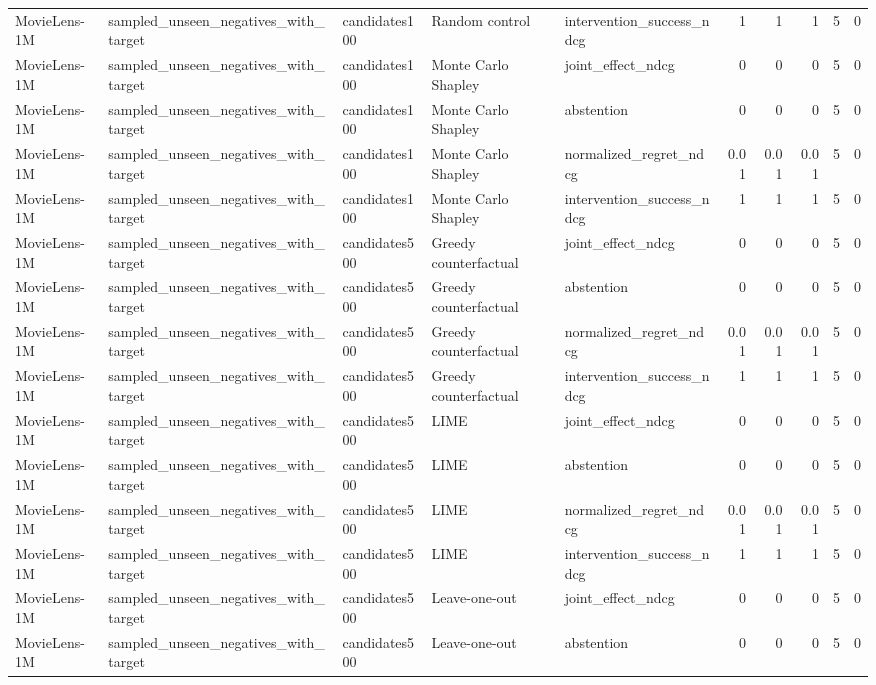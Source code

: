 \begin{table}[t]
{\begin{tabular}{lllllrrrrr}
MovieLens-1M & sampled\_unseen\_negatives\_with\_target & candidates100 & Random control & intervention\_success\_ndcg & 1 & 1 & 1 & 5 & 0 \\
MovieLens-1M & sampled\_unseen\_negatives\_with\_target & candidates100 & Monte Carlo Shapley & joint\_effect\_ndcg & 0 & 0 & 0 & 5 & 0 \\
MovieLens-1M & sampled\_unseen\_negatives\_with\_target & candidates100 & Monte Carlo Shapley & abstention & 0 & 0 & 0 & 5 & 0 \\
MovieLens-1M & sampled\_unseen\_negatives\_with\_target & candidates100 & Monte Carlo Shapley & normalized\_regret\_ndcg & 0.01 & 0.01 & 0.01 & 5 & 0 \\
MovieLens-1M & sampled\_unseen\_negatives\_with\_target & candidates100 & Monte Carlo Shapley & intervention\_success\_ndcg & 1 & 1 & 1 & 5 & 0 \\
MovieLens-1M & sampled\_unseen\_negatives\_with\_target & candidates500 & Greedy counterfactual & joint\_effect\_ndcg & 0 & 0 & 0 & 5 & 0 \\
MovieLens-1M & sampled\_unseen\_negatives\_with\_target & candidates500 & Greedy counterfactual & abstention & 0 & 0 & 0 & 5 & 0 \\
MovieLens-1M & sampled\_unseen\_negatives\_with\_target & candidates500 & Greedy counterfactual & normalized\_regret\_ndcg & 0.01 & 0.01 & 0.01 & 5 & 0 \\
MovieLens-1M & sampled\_unseen\_negatives\_with\_target & candidates500 & Greedy counterfactual & intervention\_success\_ndcg & 1 & 1 & 1 & 5 & 0 \\
MovieLens-1M & sampled\_unseen\_negatives\_with\_target & candidates500 & LIME & joint\_effect\_ndcg & 0 & 0 & 0 & 5 & 0 \\
MovieLens-1M & sampled\_unseen\_negatives\_with\_target & candidates500 & LIME & abstention & 0 & 0 & 0 & 5 & 0 \\
MovieLens-1M & sampled\_unseen\_negatives\_with\_target & candidates500 & LIME & normalized\_regret\_ndcg & 0.01 & 0.01 & 0.01 & 5 & 0 \\
MovieLens-1M & sampled\_unseen\_negatives\_with\_target & candidates500 & LIME & intervention\_success\_ndcg & 1 & 1 & 1 & 5 & 0 \\
MovieLens-1M & sampled\_unseen\_negatives\_with\_target & candidates500 & Leave-one-out & joint\_effect\_ndcg & 0 & 0 & 0 & 5 & 0 \\
MovieLens-1M & sampled\_unseen\_negatives\_with\_target & candidates500 & Leave-one-out & abstention & 0 & 0 & 0 & 5 & 0 \\

\end{tabular}}
\end{table}
